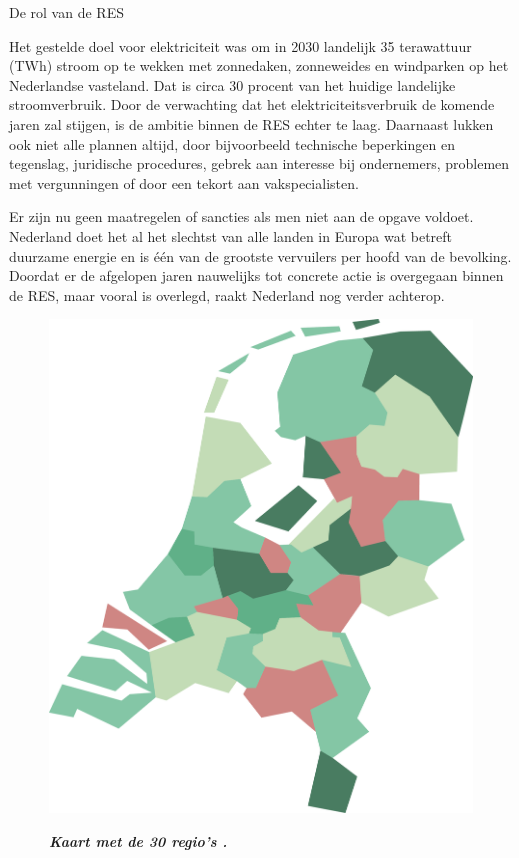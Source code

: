\begin{voorstel}{De rol van de RES}
\begin{multicols*}{2}
\begin{overwegingen}
Het gestelde doel voor elektriciteit was om in 2030 landelijk 35 terawattuur (TWh) stroom op te wekken met zonnedaken, zonneweides en windparken op het Nederlandse vasteland. Dat is circa 30 procent van het huidige landelijke stroomverbruik.
Door de verwachting dat het elektriciteitsverbruik de komende jaren zal stijgen, is de ambitie binnen de RES echter te laag.
Daarnaast lukken ook niet alle plannen altijd, door bijvoorbeeld technische beperkingen en tegenslag, juridische procedures, gebrek aan interesse bij ondernemers, problemen met vergunningen of door een tekort aan vakspecialisten.

Er zijn nu geen maatregelen of sancties als men niet aan de opgave voldoet.
Nederland doet het al het slechtst van alle landen in Europa wat betreft duurzame energie en is één van de grootste vervuilers per hoofd van de bevolking. Doordat er de afgelopen jaren nauwelijks tot concrete actie is overgegaan binnen de RES, maar vooral is overlegd, raakt Nederland nog verder achterop.

\begin{figure}[H]
	\begin{center}
		\includegraphics[width=.8\columnwidth]{img/energie/rol-van-de-res-kaart}
	\end{center}
	\textbf{\textit{Kaart met de 30 regio's \parencite{nationaal_programma_res_handreiking_2019}.}}
\end{figure}


\end{overwegingen}
\end{multicols*}
\end{voorstel}
